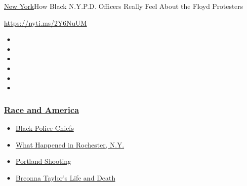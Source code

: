 \href{/section/nyregion}{New York}\textbar{}How Black N.Y.P.D. Officers
Really Feel About the Floyd Protesters

\url{https://nyti.ms/2Y6NuUM}

\begin{itemize}
\item
\item
\item
\item
\item
\item
\end{itemize}

\hypertarget{race-and-america}{%
\subsubsection{\texorpdfstring{\href{https://www.nytimes3xbfgragh.onion/news-event/george-floyd-protests-minneapolis-new-york-los-angeles?name=styln-george-floyd\&region=TOP_BANNER\&block=storyline_menu_recirc\&action=click\&pgtype=Article\&impression_id=cc9f6e50-f52f-11ea-bb13-2130c1c2f70c\&variant=undefined}{Race
and America}}{Race and America}}\label{race-and-america}}

\begin{itemize}
\tightlist
\item
  \href{https://www.nytimes3xbfgragh.onion/2020/09/11/us/black-police-chiefs-reform.html?name=styln-george-floyd\&region=TOP_BANNER\&block=storyline_menu_recirc\&action=click\&pgtype=Article\&impression_id=cc9f6e51-f52f-11ea-bb13-2130c1c2f70c\&variant=undefined}{Black
  Police Chiefs}
\item
  \href{https://www.nytimes3xbfgragh.onion/2020/09/04/nyregion/rochester-police-daniel-prude.html?name=styln-george-floyd\&region=TOP_BANNER\&block=storyline_menu_recirc\&action=click\&pgtype=Article\&impression_id=cc9f6e52-f52f-11ea-bb13-2130c1c2f70c\&variant=undefined}{What
  Happened in Rochester, N.Y.}
\item
  \href{https://www.nytimes3xbfgragh.onion/2020/08/30/us/portland-shooting-explained.html?name=styln-george-floyd\&region=TOP_BANNER\&block=storyline_menu_recirc\&action=click\&pgtype=Article\&impression_id=cc9f6e53-f52f-11ea-bb13-2130c1c2f70c\&variant=undefined}{Portland
  Shooting}
\item
  \href{https://www.nytimes3xbfgragh.onion/2020/08/30/us/breonna-taylor-police-killing.html?name=styln-george-floyd\&region=TOP_BANNER\&block=storyline_menu_recirc\&action=click\&pgtype=Article\&impression_id=cc9f9560-f52f-11ea-bb13-2130c1c2f70c\&variant=undefined}{Breonna
  Taylor's Life and Death}
\end{itemize}

